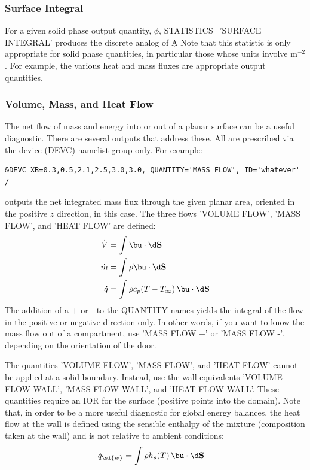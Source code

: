 \documentclass[11pt]{book}
\begin{document}
\subsubsection{Surface Integral}

For a given solid phase output quantity, $\phi$, {\ct STATISTICS='SURFACE INTEGRAL'} produces the discrete analog of
\be \int \phi \; \d A \ee
Note that this statistic is only appropriate for solid phase quantities, in particular those whose units involve m$^{-2}$. For example, the various heat and mass
fluxes are appropriate output quantities.


\subsubsection{Volume, Mass, and Heat Flow}
\label{info:flows}

The net flow of mass and energy into or out of a planar surface can be a useful diagnostic. There are several outputs that address these. All are prescribed via
the device ({\ct DEVC}) namelist group only. For example:

\begin{lstlisting}
&DEVC XB=0.3,0.5,2.1,2.5,3.0,3.0, QUANTITY='MASS FLOW', ID='whatever' /
\end{lstlisting}

\noindent
outputs the net integrated mass flux through the given planar area, oriented in the positive $z$ direction, in this case. The three flows {\ct 'VOLUME FLOW'}, {\ct 'MASS FLOW'},
and {\ct 'HEAT FLOW'} are defined:
\begin{align}
\dot{V} &= \int \bu \cdot \d \mathbf{S}  \\
\dot{m} &= \int \rho \bu \cdot \d \mathbf{S} \\
\dot{q} &= \int \rho c_p (T-T_\infty) \, \bu \cdot \d \mathbf{S}
\end{align}
The addition of a {\ct +} or {\ct -} to the {\ct QUANTITY} names yields the integral of the flow in the positive or negative direction only. In other words, if you want to know the mass flow out of a compartment, use {\ct 'MASS FLOW +'} or {\ct 'MASS FLOW -'}, depending on the orientation of the door.

The quantities {\ct 'VOLUME FLOW'}, {\ct 'MASS FLOW'}, and {\ct 'HEAT FLOW'} cannot be applied at a solid boundary.  Instead, use the wall equivalents {\ct 'VOLUME FLOW WALL'}, {\ct 'MASS FLOW WALL'}, and {\ct 'HEAT FLOW WALL'}.  These quantities require an {\ct IOR} for the surface (positive points into the domain).  Note that, in order to be a more useful diagnostic for global energy balances, the heat flow at the wall is defined using the sensible enthalpy of the mixture (composition taken at the wall) and is not relative to ambient conditions:
\begin{align}
\dot{q}_{\si{w}} &= \int \rho h_s(T) \, \bu \cdot \d \mathbf{S}
\end{align}
\end{document}

